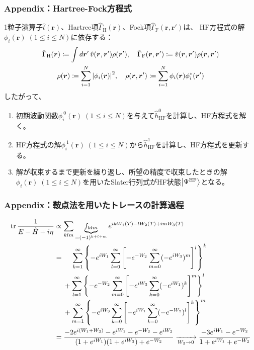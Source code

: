 \documentclass[14pt,aspectratio=169,xcolor=dvipsnames,table,dvipdfmx]{beamer}
\theoremstyle{definition}
\begin{document}
\begin{frame}
  \frametitle{Appendix：Hartree-Fock方程式}
  \small
  1粒子演算子$\hat{t}(\bm{r})$、Hartree項$\hat{\Gamma}_{\text{H}}(\bm{r})$、Fock項$\hat{\Gamma}_{\text{F}}(\bm{r},\bm{r}')$は、
  HF方程式の解$\phi_i(\bm{r})\;(1\leq i\leq N)$に依存する：
  \begin{gather*}
    \hat{\Gamma}_{\text{H}}(\bm{r})\coloneqq \int d\bm{r}'\,\hat{v}(\bm{r},\bm{r}')\rho(\bm{r}'),\quad\hat{\Gamma}_{\text{F}}(\bm{r},\bm{r}')\coloneqq \hat{v}(\bm{r},\bm{r}')\rho(\bm{r},\bm{r}')      \\
    \rho(\bm{r}) \coloneqq \sum_{i=1}^{N}\abs{\phi_i(\bm{r})}^2 ,\quad\rho(\bm{r},\bm{r}')\coloneqq \sum_{i=1}^{N}\phi_i(\bm{r})\phi_i^{*}(\bm{r}')
  \end{gather*}
  したがって、
  \begin{enumerate}
    \item 初期波動関数$\phi^{~0}_i(\bm{r})\;(1\leq i\leq N)$を与えて$\hat{h}^{0}_{\text{HF}}$を計算し、HF方程式を解く。
    \item HF方程式の解$\phi^{~1}_i(\bm{r})\;(1\leq i\leq N)$から$\hat{h}^{1}_{\text{HF}}$を計算し、HF方程式を更新する。
    \item 解が収束するまで更新を繰り返し、所望の精度で収束したときの解$\phi_i(\bm{r})\;(1\leq i\leq N)$を用いたSlater行列式がHF状態$\ket{\Psi^{\text{HF}}}$となる。
  \end{enumerate}
\end{frame}

\begin{frame}
  \frametitle{Appendix：鞍点法を用いたトレースの計算過程}
  \footnotesize
  \begin{align*}
    \trace{\frac{1}{E-\hat{H}+i\eta}} & \propto \sum_{klm}\underbrace{f_{klm}}_{=(-1)^{k+l+m}}e^{ikW_1(T)-lW_2(T)+imW_3(T)}                                                                           \\
                                      & = \quad\; \sum_{k=1}^{\infty}\qty{-e^{iW_1}\sum_{l=0}^{\infty}\qty[-e^{-W_2}\sum_{m=0}^{\infty}(-e^{iW_3})^m]^l}^k                                            \\
                                      & \quad\; + \sum_{l=1}^{\infty}\qty{-e^{-W_2}\sum_{m=0}^{\infty}\qty[-e^{iW_3}\sum_{k=0}^{\infty}(-e^{iW_1})^k]^m}^l                                            \\
                                      & \quad\; + \sum_{m=1}^{\infty}\qty{-e^{iW_3}\sum_{k=0}^{\infty}\qty[-e^{iW_1}\sum_{k=0}^{\infty}(-e^{-W_2})^l]^k}^m                                            \\
                                      & = \frac{-2e^{i(W_1+W_3)}-e^{iW_1}-e^{-W_2}-e^{iW_3}}{(1+e^{iW_1})(1+e^{iW_3})+e^{-W_2}}\xrightarrow[W_3\to0]{}\frac{-3e^{iW_1}-e^{-W_2}}{1+e^{iW_1}+e^{-W_2}}
  \end{align*}
\end{frame}
\end{document}
